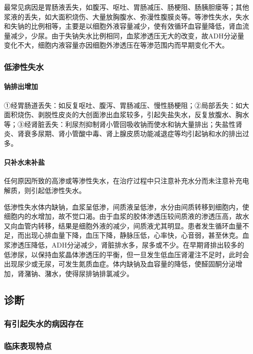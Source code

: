 最常见病因是胃肠液丢失，如腹泻、呕吐、胃肠减压、肠梗阻、肠胰胆瘘等；其他浆液的丢失，如大面积烧伤、大量放胸腹水、弥漫性腹膜炎等。等渗性失水，失水和失钠的比例相等，主要是以细胞外液容量减少，使有效循环血容量降低，肾血流量减少，少尿。由于失钠失水比例相同，血浆渗透压无大的改变，故ADH分泌量变化不大，细胞内液容量亦因细胞外渗透压在等渗范围内而早期变化不大。

\subsubsection{低渗性失水}

\paragraph{钠排出增加}

①经胃肠道丢失：如反复呕吐、腹泻、胃肠减压、慢性肠梗阻；②局部丢失：如大面积烧伤、剥脱性皮炎的大创面渗出血浆较多，引起失盐失水，反复放腹水、胸水等；③经肾脏丢失：利尿剂抑制肾小管回吸收钠而使水和钠大量排出；失盐性肾炎、肾衰多尿期、肾小管酸中毒、肾上腺皮质功能减退症等均引起钠和水的排出过多。

\paragraph{只补水未补盐}

任何原因所致的高渗或等渗性失水，在治疗过程中只注意补充水分而未注意补充电解质，则引起低渗性失水。

低渗性失水体内缺钠，血浆呈低渗，间质液呈低渗，水分由间质转移到细胞内，使细胞内的水增加，故不觉口渴。由于血浆的胶体渗透压较间质液的渗透压高，故水又向血管内转移，结果是细胞外液的减少，间质液尤其明显。患者发生循环血量不足，而出现心排血量下降，血压下降，静脉压低，心率快，心音弱，甚至休克。血浆渗透压降低，ADH分泌减少，肾脏排水多，尿多或不少。在早期肾排出较多的低渗尿，以保持血浆晶体渗透压的平衡，但一旦发生低血压肾灌注不足时，此时会出现尿少或无尿，可发生氮质血症。体内缺钠及血容量的降低，使醛固酮分泌增加，肾潴钠、潴水，使得尿排钠排氯减少。

\subsection{诊断}

\subsubsection{有引起失水的病因存在}

\subsubsection{临床表现特点}

